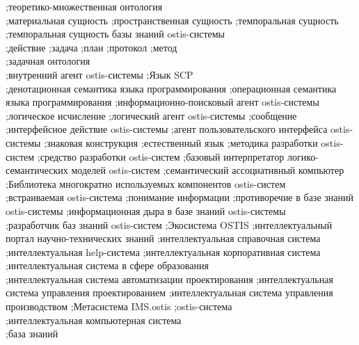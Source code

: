 {;теоретико-множественная онтология\\
;материальная сущность
;пространственная сущность
;темпоральная сущность\\
;темпоральная сущность базы знаний ostis-системы\\
;действие
;задача
;план
;протокол
;метод\\
;задачная онтология\\
;внутренний агент ostis-системы
;Язык SCP\\
;денотационная семантика языка программирования
;операционная семантика языка программирования
;информационно-поисковый агент ostis-системы
;логическое исчисление
;логический агент ostis-системы
;сообщение
;интерфейсное действие ostis-системы
;агент пользовательского интерфейса ostis-системы
;знаковая конструкция
;естественный язык
;методика разработки ostis-систем
;средство разработки ostis-систем
;базовый интерпретатор логико-семантических моделей ostis-систем
;семантический ассоциативный компьютер
;Библиотека многократно используемых компонентов ostis-систем\\
;встраиваемая ostis-система
;понимание информации
;противоречие в базе знаний ostis-системы
;информационная дыра в базе знаний ostis-системы\\
;разработчик баз знаний ostis-систем
;Экосистема OSTIS
;интеллектуальный портал научно-технических знаний
;интеллектуальная справочная система
;интеллектуальная help-система
;интеллектуальная корпоративная система
;интеллектуальная система в сфере образования\\
;интеллектуальная система автоматизации проектирования
;интеллектуальная система управления проектированием
;интеллектуальная система управления производством
;Метасистема IMS.ostis
;ostis-система\\
;интеллектуальная компьютерная система\\
;база знаний
}